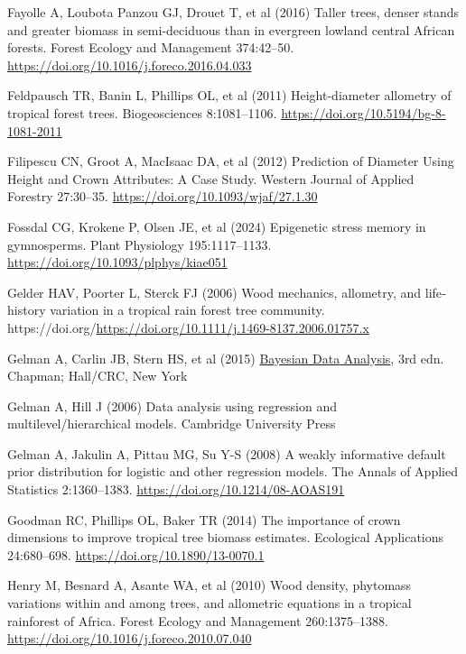 \documentclass[
  12pt,
  letterpaper,
  DIV=11,
  numbers=noendperiod]{scrartcl}
\newlength{\cslhangindent}
\newenvironment{CSLReferences}[2] %
 {\begin{list}{}{%
  \setlength{\itemindent}{0pt}
  \setlength{\leftmargin}{0pt}
  \setlength{\parsep}{0pt}
  \ifodd #1
   \setlength{\leftmargin}{\cslhangindent}
   \setlength{\itemindent}{-1\cslhangindent}
  \fi
  \setlength{\itemsep}{#2\baselineskip}}}
 {\end{list}}
\begin{document}
\begin{CSLReferences}{1}{1}
Fayolle A, Loubota Panzou GJ, Drouet T, et al (2016) Taller trees,
denser stands and greater biomass in semi-deciduous than in evergreen
lowland central {African} forests. Forest Ecology and Management
374:42--50. \url{https://doi.org/10.1016/j.foreco.2016.04.033}

Feldpausch TR, Banin L, Phillips OL, et al (2011) Height-diameter
allometry of tropical forest trees. Biogeosciences 8:1081--1106.
\url{https://doi.org/10.5194/bg-8-1081-2011}

Filipescu CN, Groot A, MacIsaac DA, et al (2012) Prediction of
{Diameter} {Using} {Height} and {Crown} {Attributes}: {A} {Case}
{Study}. Western Journal of Applied Forestry 27:30--35.
\url{https://doi.org/10.1093/wjaf/27.1.30}

Fossdal CG, Krokene P, Olsen JE, et al (2024) Epigenetic stress memory
in gymnosperms. Plant Physiology 195:1117--1133.
\url{https://doi.org/10.1093/plphys/kiae051}

Gelder HAV, Poorter L, Sterck FJ (2006) Wood mechanics, allometry, and
life‐history variation in a tropical rain forest tree community.
https://doi.org/\url{https://doi.org/10.1111/j.1469-8137.2006.01757.x}

Gelman A, Carlin JB, Stern HS, et al (2015)
\href{https://doi.org/10.1201/b16018}{Bayesian {Data} {Analysis}}, 3rd
edn. Chapman; Hall/CRC, New York

Gelman A, Hill J (2006) Data analysis using regression and
multilevel/hierarchical models. Cambridge University Press

Gelman A, Jakulin A, Pittau MG, Su Y-S (2008) A weakly informative
default prior distribution for logistic and other regression models. The
Annals of Applied Statistics 2:1360--1383.
\url{https://doi.org/10.1214/08-AOAS191}

Goodman RC, Phillips OL, Baker TR (2014) The importance of crown
dimensions to improve tropical tree biomass estimates. Ecological
Applications 24:680--698. \url{https://doi.org/10.1890/13-0070.1}

Henry M, Besnard A, Asante WA, et al (2010) Wood density, phytomass
variations within and among trees, and allometric equations in a
tropical rainforest of {Africa}. Forest Ecology and Management
260:1375--1388. \url{https://doi.org/10.1016/j.foreco.2010.07.040}


\end{CSLReferences}
\end{document}
